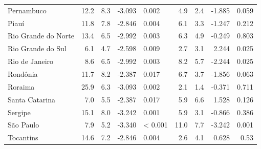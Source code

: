 \begin{table}[!t]
\begin{tabular*}{\linewidth}{@{\extracolsep{\fill}}lrrrlrrrr}
Pernambuco & 12.2 & 8.3 & -3.093 & 0.002 & 4.9 & 2.4 & -1.885 & 0.059 \\ 
Piauí & 11.8 & 7.8 & -2.846 & 0.004 & 6.1 & 3.3 & -1.247 & 0.212 \\ 
Rio Grande do Norte & 13.4 & 6.5 & -2.992 & 0.003 & 6.3 & 4.9 & -0.249 & 0.803 \\ 
Rio Grande do Sul & 6.1 & 4.7 & -2.598 & 0.009 & 2.7 & 3.1 & 2.244 & 0.025 \\ 
Rio de Janeiro & 8.6 & 6.5 & -2.992 & 0.003 & 8.2 & 5.7 & -2.244 & 0.025 \\ 
Rondônia & 11.7 & 8.2 & -2.387 & 0.017 & 6.7 & 3.7 & -1.856 & 0.063 \\ 
Roraima & 25.9 & 6.3 & -3.093 & 0.002 & 2.1 & 1.4 & -0.371 & 0.711 \\ 
Santa Catarina & 7.0 & 5.5 & -2.387 & 0.017 & 5.9 & 6.6 & 1.528 & 0.126 \\ 
Sergipe & 15.1 & 8.0 & -3.242 & 0.001 & 5.9 & 3.1 & -0.866 & 0.386 \\ 
São Paulo & 7.9 & 5.2 & -3.340 & < 0.001 & 11.0 & 7.7 & -3.242 & 0.001 \\ 
Tocantins & 14.6 & 7.2 & -2.846 & 0.004 & 2.6 & 4.1 & 0.628 & 0.53 \\ 
\bottomrule
\end{tabular*}
\end{table}

